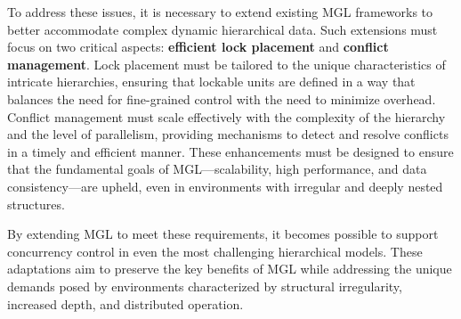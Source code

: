To address these issues, it is necessary to extend existing MGL frameworks to better accommodate complex dynamic hierarchical data. Such extensions must focus on two critical aspects: \textbf{efficient lock placement} and \textbf{conflict management}. Lock placement must be tailored to the unique characteristics of intricate hierarchies, ensuring that lockable units are defined in a way that balances the need for fine-grained control with the need to minimize overhead. Conflict management must scale effectively with the complexity of the hierarchy and the level of parallelism, providing mechanisms to detect and resolve conflicts in a timely and efficient manner. These enhancements must be designed to ensure that the fundamental goals of MGL—scalability, high performance, and data consistency—are upheld, even in environments with irregular and deeply nested structures.

By extending MGL to meet these requirements, it becomes possible to support concurrency control in even the most challenging hierarchical models. These adaptations aim to preserve the key benefits of MGL while addressing the unique demands posed by environments characterized by structural irregularity, increased depth, and distributed operation.







